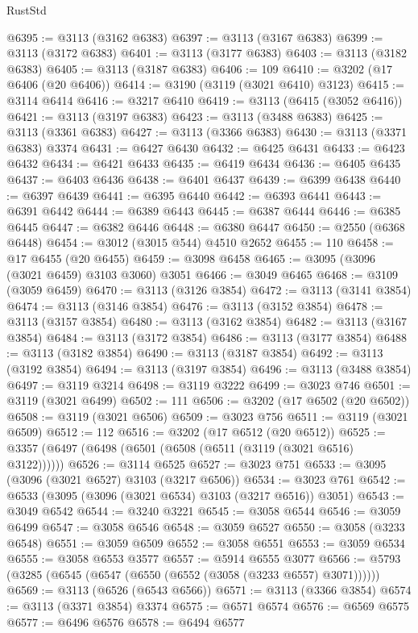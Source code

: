 \begin{lexlean}{RustStd}
\begin{coremodule}
{\begin{coremodule}
{{{{{{{{{{{{{{{{{{{{{{{{{{{{{{{{@6395 := @3113 (@3162 @6383)
@6397 := @3113 (@3167 @6383)
@6399 := @3113 (@3172 @6383)
@6401 := @3113 (@3177 @6383)
@6403 := @3113 (@3182 @6383)
@6405 := @3113 (@3187 @6383)
@6406 := 109
@6410 := @3202 (@17 @6406 (@20 @6406))
@6414 := @3190 (@3119 (@3021 @6410) @3123)
@6415 := @3114 @6414
@6416 := @3217 @6410
@6419 := @3113 (@6415 (@3052 @6416))
@6421 := @3113 (@3197 @6383)
@6423 := @3113 (@3488 @6383)
@6425 := @3113 (@3361 @6383)
@6427 := @3113 (@3366 @6383)
@6430 := @3113 (@3371 @6383) @3374
@6431 := @6427 @6430
@6432 := @6425 @6431
@6433 := @6423 @6432
@6434 := @6421 @6433
@6435 := @6419 @6434
@6436 := @6405 @6435
@6437 := @6403 @6436
@6438 := @6401 @6437
@6439 := @6399 @6438
@6440 := @6397 @6439
@6441 := @6395 @6440
@6442 := @6393 @6441
@6443 := @6391 @6442
@6444 := @6389 @6443
@6445 := @6387 @6444
@6446 := @6385 @6445
@6447 := @6382 @6446
@6448 := @6380 @6447
@6450 := @2550 (@6368 @6448)
@6454 := @3012 (@3015 @544) @4510 @2652
@6455 := 110
@6458 := @17 @6455 (@20 @6455)
@6459 := @3098 @6458
@6465 := @3095 (@3096 (@3021 @6459) @3103 @3060) @3051
@6466 := @3049 @6465
@6468 := @3109 (@3059 @6459)
@6470 := @3113 (@3126 @3854)
@6472 := @3113 (@3141 @3854)
@6474 := @3113 (@3146 @3854)
@6476 := @3113 (@3152 @3854)
@6478 := @3113 (@3157 @3854)
@6480 := @3113 (@3162 @3854)
@6482 := @3113 (@3167 @3854)
@6484 := @3113 (@3172 @3854)
@6486 := @3113 (@3177 @3854)
@6488 := @3113 (@3182 @3854)
@6490 := @3113 (@3187 @3854)
@6492 := @3113 (@3192 @3854)
@6494 := @3113 (@3197 @3854)
@6496 := @3113 (@3488 @3854)
@6497 := @3119 @3214
@6498 := @3119 @3222
@6499 := @3023 @746
@6501 := @3119 (@3021 @6499)
@6502 := 111
@6506 := @3202 (@17 @6502 (@20 @6502))
@6508 := @3119 (@3021 @6506)
@6509 := @3023 @756
@6511 := @3119 (@3021 @6509)
@6512 := 112
@6516 := @3202 (@17 @6512 (@20 @6512))
@6525 := @3357 (@6497 (@6498 (@6501 (@6508 (@6511 (@3119 (@3021 @6516) @3122))))))
@6526 := @3114 @6525
@6527 := @3023 @751
@6533 := @3095 (@3096 (@3021 @6527) @3103 (@3217 @6506))
@6534 := @3023 @761
@6542 := @6533 (@3095 (@3096 (@3021 @6534) @3103 (@3217 @6516)) @3051)
@6543 := @3049 @6542
@6544 := @3240 @3221
@6545 := @3058 @6544
@6546 := @3059 @6499
@6547 := @3058 @6546
@6548 := @3059 @6527
@6550 := @3058 (@3233 @6548)
@6551 := @3059 @6509
@6552 := @3058 @6551
@6553 := @3059 @6534
@6555 := @3058 @6553 @3577
@6557 := @5914 @6555 @3077
@6566 := @5793 (@3285 (@6545 (@6547 (@6550 (@6552 (@3058 (@3233 @6557) @3071))))))
@6569 := @3113 (@6526 (@6543 @6566))
@6571 := @3113 (@3366 @3854)
@6574 := @3113 (@3371 @3854) @3374
@6575 := @6571 @6574
@6576 := @6569 @6575
@6577 := @6496 @6576
@6578 := @6494 @6577
}}}}}}}}}}}}}}}}}}}}}}}}}}}}}}}}
\end{coremodule}}
\end{coremodule}
\end{lexlean}
